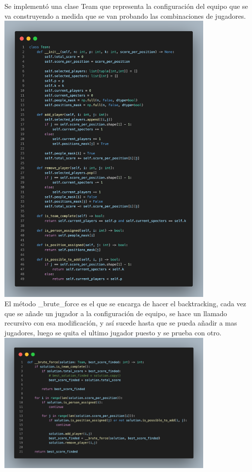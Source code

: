 \documentclass[sn-mathphys,Numbered]{sn-jnl}%
\theoremstyle{thmstyleone}%
\theoremstyle{thmstyletwo}%
\theoremstyle{thmstylethree}%
\begin{document}
Se implement\'o una clase Team que representa la configuraci\'on del equipo que se va construyendo a medida que se van probando las combinaciones de jugadores.\\
 \includegraphics[width=0.8\textwidth]{code1.png}
\\
El m\'etodo \_brute\_force es el que se encarga de hacer el backtracking, cada vez que se a\~nade un jugador a la configuraci\'on de equipo, se hace un llamado recursivo con esa modificaci\'on, y as\'i sucede hasta que se pueda a\~nadir a mas jugadores, luego se quita el ultimo jugador puesto y se prueba con otro.
\includegraphics[width=0.8\textwidth]{code2.png}\\
\end{document}
